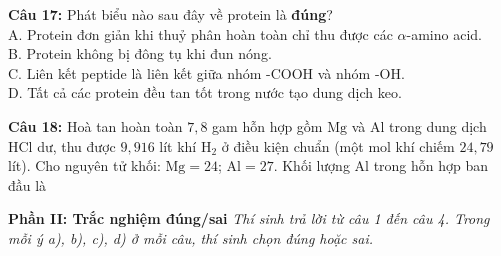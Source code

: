 \documentclass[12pt,a4paper]{article}
\begin{document}
\par\noindent\begin{minipage}{\linewidth}
\noindent \textbf{Câu 17:} Phát biểu nào sau đây về protein là \textbf{đúng}?\\
\noindent A. Protein đơn giản khi thuỷ phân hoàn toàn chỉ thu được các $\alpha$-amino acid.\\
\noindent B. Protein không bị đông tụ khi đun nóng.\\
\noindent C. Liên kết peptide là liên kết giữa nhóm $\text{-COOH}$ và nhóm $\text{-OH}$.\\
\noindent D. Tất cả các protein đều tan tốt trong nước tạo dung dịch keo.
\end{minipage}\par\vspace{0.12cm}

\par\noindent\begin{minipage}{\linewidth}
\noindent \textbf{Câu 18:} Hoà tan hoàn toàn $7{,}8$ gam hỗn hợp gồm $\text{Mg}$ và $\text{Al}$ trong dung dịch $\text{HCl}$ dư, thu được $9{,}916$ lít khí $\text{H}_2$ ở điều kiện chuẩn (một mol khí chiếm $24{,}79$ lít). Cho nguyên tử khối: $\text{Mg} = 24$; $\text{Al} = 27$. Khối lượng $\text{Al}$ trong hỗn hợp ban đầu là\\
\noindent{}

\vspace{0.5cm}
\end{minipage}\par\vspace{0.12cm}
\textbf{Phần II: Trắc nghiệm đúng/sai} \textit{Thí sinh trả lời từ câu 1 đến câu 4. Trong mỗi ý a), b), c), d) ở mỗi câu, thí sinh chọn đúng hoặc sai.}
\end{document}
